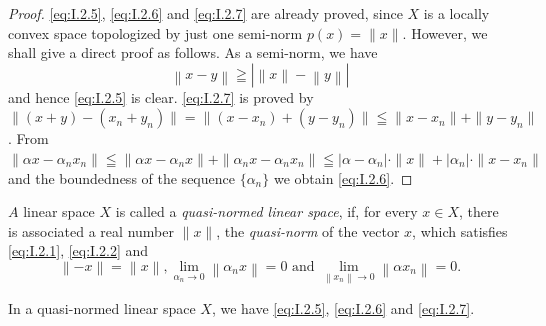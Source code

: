 \begin{proof}
 \eqref{eq:I.2.5}, \eqref{eq:I.2.6} and \eqref{eq:I.2.7} are already proved, since $X$ is a locally convex space topologized by just one semi-norm $p(x) = \|x\|$. However, we shall give a direct proof as follows. As a semi-norm, we have 
\begin{equation}\label{eq:I.2.8}
\left\| x- y \right\| \geqq \left| \left\| x \right\|- \left\| y \right\| \right|
\end{equation}
and hence \eqref{eq:I.2.5} is clear. \eqref{eq:I.2.7} is proved by $\|(x + y)- (x_n + y_n)\| = \|(x- x_n) + (y- y_n)\| \leqq \|x- x_n\| + \|y- y_n\|$. From $\|\alpha x- \alpha_n x_n\| \leqq \|\alpha x- \alpha_n x\| + \|\alpha_n x- \alpha_n x_n\| \leqq |\alpha- \alpha_n| \cdot \|x\| + |\alpha_n| \cdot \|x- x_n\|$ and the boundedness of the sequence $\{\alpha_n\}$ we obtain \eqref{eq:I.2.6}. 
\end{proof}

\begin{definition}\label{def:I.2.Definition.2} $A$ linear space $X$ is called a \emph{quasi-normed linear space}, if, for every $x \in X$, there is associated a real number $\|x\|$, the \emph{quasi-norm} of the vector $x$, which satisfies \eqref{eq:I.2.1}, \eqref{eq:I.2.2} and 
\begin{equation}\tag{3'}\label{eq:I.2.3'}
\left\|- x \right\| = \left\| x \right\|, \lim\limits_ {\alpha_{n} \rightarrow 0} \left\| \alpha_{n} x \right\| = 0 \text{ and } \lim\limits_ {\left\| x_{n} \right\|\rightarrow 0} \left\| \alpha x_{n} \right\| = 0.
\end{equation}
\end{definition}

\begin{proposition}\label{prop:I.2.Proposition.2} In a quasi-normed linear space $X$, we have \eqref{eq:I.2.5}, \eqref{eq:I.2.6} and \eqref{eq:I.2.7}. 
\end{proposition}

